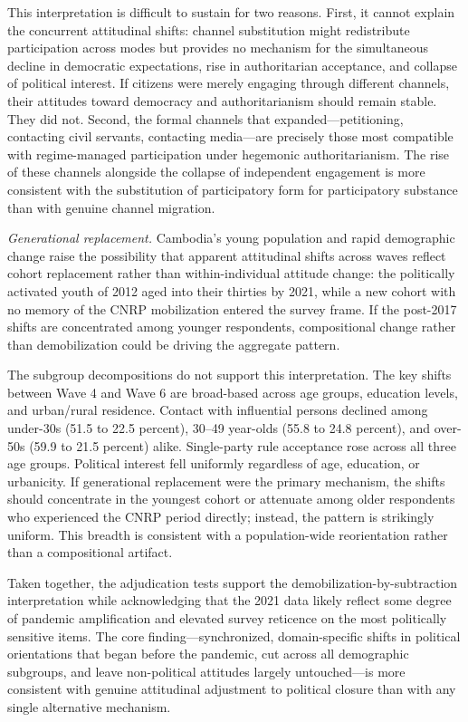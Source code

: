 \documentclass[
  12pt,
  letterpaper]{article}
\begin{document}
This interpretation is difficult to sustain for two reasons. First, it
cannot explain the concurrent attitudinal shifts: channel substitution
might redistribute participation across modes but provides no mechanism
for the simultaneous decline in democratic expectations, rise in
authoritarian acceptance, and collapse of political interest. If
citizens were merely engaging through different channels, their
attitudes toward democracy and authoritarianism should remain stable.
They did not. Second, the formal channels that expanded---petitioning,
contacting civil servants, contacting media---are precisely those most
compatible with regime-managed participation under hegemonic
authoritarianism. The rise of these channels alongside the collapse of
independent engagement is more consistent with the substitution of
participatory form for participatory substance than with genuine channel
migration.

\emph{Generational replacement.} Cambodia's young population and rapid
demographic change raise the possibility that apparent attitudinal
shifts across waves reflect cohort replacement rather than
within-individual attitude change: the politically activated youth of
2012 aged into their thirties by 2021, while a new cohort with no memory
of the CNRP mobilization entered the survey frame. If the post-2017
shifts are concentrated among younger respondents, compositional change
rather than demobilization could be driving the aggregate pattern.

The subgroup decompositions do not support this interpretation. The key
shifts between Wave 4 and Wave 6 are broad-based across age groups,
education levels, and urban/rural residence. Contact with influential
persons declined among under-30s (51.5 to 22.5 percent), 30--49
year-olds (55.8 to 24.8 percent), and over-50s (59.9 to 21.5 percent)
alike. Single-party rule acceptance rose across all three age groups.
Political interest fell uniformly regardless of age, education, or
urbanicity. If generational replacement were the primary mechanism, the
shifts should concentrate in the youngest cohort or attenuate among
older respondents who experienced the CNRP period directly; instead, the
pattern is strikingly uniform. This breadth is consistent with a
population-wide reorientation rather than a compositional artifact.

Taken together, the adjudication tests support the
demobilization-by-subtraction interpretation while acknowledging that
the 2021 data likely reflect some degree of pandemic amplification and
elevated survey reticence on the most politically sensitive items. The
core finding---synchronized, domain-specific shifts in political
orientations that began before the pandemic, cut across all demographic
subgroups, and leave non-political attitudes largely untouched---is more
consistent with genuine attitudinal adjustment to political closure than
with any single alternative mechanism.
\end{document}
